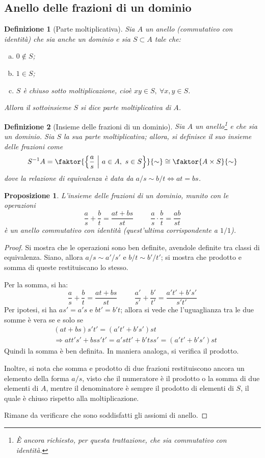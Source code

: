 \documentclass[11pt]{article}
\theoremstyle{style}
\newtheorem{definizione}{Definizione}[section]
\newtheorem{prop}{Proposizione}[section]
\numberwithin{equation}{subsection}
\begin{document}
\subsection{Anello delle frazioni di un dominio}
\begin{definizione}
	[Parte moltiplicativa]
	Sia $A$ un anello (commutativo con identit\`a) che sia anche un dominio e sia $S \subset A$ tale che:
	\begin{enumerate}[(a).]
		\item $0 \not \in S$;
		\item $1 \in S$;
		\item $S$ \`e chiuso sotto moltiplicazione, cio\`e $xy \in S, \ \forall x,y \in S$.
	\end{enumerate}
	Allora il sottoinsieme $S$ si dice \textit{parte moltiplicativa} di $A$.
\end{definizione}
\begin{definizione}
	[Insieme delle frazioni di un dominio]
	Sia $A$ un anello\footnote{\`E ancora richiesto, per questa trattazione, che sia commutativo con identit\`a.} e che sia un dominio.
	Sia $S$ la sua parte moltiplicativa; allora, si definisce il suo \textit{insieme delle frazioni} come
	\[
		S^{-1}A = \faktor{\left\{ \frac{a}{s}\ \Big\lvert \  a \in A ,\ s \in S \right\}}{\sim} \cong \faktor{A\times S}{\sim}
	\] 
	dove la relazione di equivalenza \`e data da $a / s \sim b / t \iff at = bs$.
\end{definizione}
\begin{prop}
	L'insieme delle frazioni di un dominio, munito con le operazioni
	\[
	\frac{a}{s}+\frac{b}{t}=\frac{at + bs}{st} \hspace{1cm} \frac{a}{s}\cdot \frac{b}{t} = \frac{ab}{st}
	\] 
	\`e un anello commutativo con identit\`a (quest'ultima corrispondente a $1 / 1$).
\end{prop}
	\begin{proof}
		Si mostra che le operazioni sono ben definite, avendole definite tra classi di equivalenza. 
		Siano, allora $a / s \sim a' / s' $ e $ b/t \sim b' / t'$; si mostra che prodotto e somma di queste restituiscano lo stesso.

		Per la somma, si ha:
		\[
		\frac{a}{s}+\frac{b}{t}=\frac{at + bs}{st}\hspace{1cm}\frac{a'}{s'}+\frac{b'}{t'}=\frac{a't' + b's'}{s't'}
		\] 
		Per ipotesi, si ha $as' = a' s $ e $bt' = b' t$; allora si vede che l'uguaglianza tra le due somme \`e vera se e solo se 
		\[
			\begin{split}
				&(at + bs ) s ' t' = (a't'+b's') st\\
				&\Rightarrow att's' + bs s't' = a'st t ' + b't s s' = (a't'+b's') st
			\end{split}
		\] 
		Quindi la somma \`e ben definita.
		In maniera analoga, si verifica il prodotto.

		Inoltre, si nota che somma e prodotto di due frazioni restituiscono ancora un elemento della forma $a / s$, visto che il numeratore \`e il prodotto o la somma di due elementi di $A$, mentre il denominatore \`e sempre il prodotto di elementi di $S$, il quale \`e chiuso rispetto alla moltiplicazione.
		
		Rimane da verificare che sono soddisfatti gli assiomi di anello.
	\end{proof}
\end{document}

